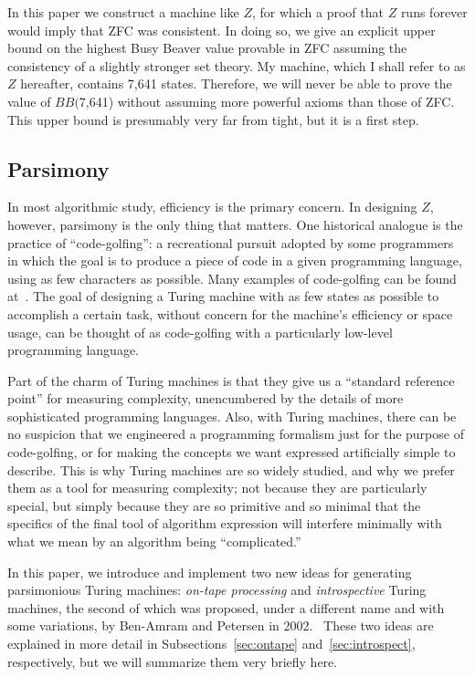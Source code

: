 \documentclass[11pt]{article}
\newcommand{\statenum}{7,641 }
\newcommand{\bbstatenum}{$BB($7,641) }
\begin{document}
In this paper we construct a machine like $Z$, for which a proof that $Z$ runs forever would imply that ZFC was consistent. In doing so, we give an explicit upper bound on the highest Busy Beaver value provable in ZFC assuming the consistency of a slightly stronger set theory. My machine, which I shall refer to as $Z$ hereafter, contains \statenum states. Therefore, we will never be able to prove the value of \bbstatenum without assuming more powerful axioms than those of ZFC. This upper bound is presumably very far from tight, but it is a first step.

\subsection{Parsimony}

In most algorithmic study, efficiency is the primary concern. In designing $Z$, however, parsimony is the only thing that matters. One historical analogue is the practice of ``code-golfing'': a recreational pursuit adopted by some programmers in which the goal is to produce a piece of code in a given programming language, using as few characters as possible. Many examples of code-golfing can be found at~\cite{codegolf}. The goal of designing a Turing machine with as few states as possible to accomplish a certain task, without concern for the machine's efficiency or space usage, can be thought of as code-golfing with a particularly low-level programming language. 

Part of the charm of Turing machines is that they give us a ``standard reference point'' for measuring complexity, unencumbered by the details of more sophisticated programming languages. Also, with Turing machines, there can be no suspicion that we engineered a programming formalism just for the purpose of code-golfing, or for making the concepts we want expressed artificially simple to describe. This is why Turing machines are so widely studied, and why we prefer them as a tool for measuring complexity; not because they are particularly special, but simply because they are so primitive and so minimal that the specifics of the final tool of algorithm expression will interfere minimally with what we mean by an algorithm being ``complicated.''

In this paper, we introduce and implement two new ideas for generating parsimonious Turing machines: \emph{on-tape processing} and \emph{introspective} Turing machines, the second of which was proposed, under a different name and with some variations, by Ben-Amram and Petersen in 2002.~\cite{benamram} These two ideas are explained in more detail in Subsections~\ref{sec:ontape} and~\ref{sec:introspect}, respectively, but we will summarize them very briefly here. 
\end{document}
